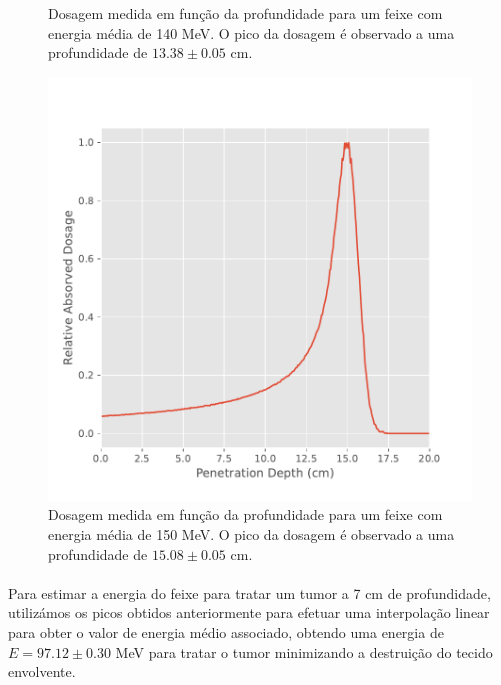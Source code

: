 \documentclass[a4paper, 12pt]{article} %
\begin{document}
\begin{figure}[H]
\begin{minipage}[r]{.49\linewidth}
			\caption{Dosagem medida em função da profundidade para um feixe com energia média de 140 MeV. O pico da dosagem é observado a uma profundidade de $13.38  \pm 0.05$ cm.}
			\label{fig:bragg_peak140}
		\end{minipage}
	\end{figure}
	\begin{figure}[H]
		\centering
		\includegraphics[width=0.5\linewidth]{bragg_peak_150mev.pdf}
		\caption{Dosagem medida em função da profundidade para um feixe com energia média de 150 MeV. O pico da dosagem é observado a uma profundidade de $15.08 \pm 0.05$ cm.}
		\label{fig:bragg_peak150}
	\end{figure}

	\paragraph{} Para estimar a energia do feixe para tratar um tumor a 7 cm de profundidade, utilizámos os picos obtidos anteriormente para efetuar uma interpolação linear para obter o valor de energia médio associado, obtendo uma energia de $E=97.12 \pm 0.30$ MeV para tratar o tumor minimizando a destruição do tecido envolvente.
\end{document}
